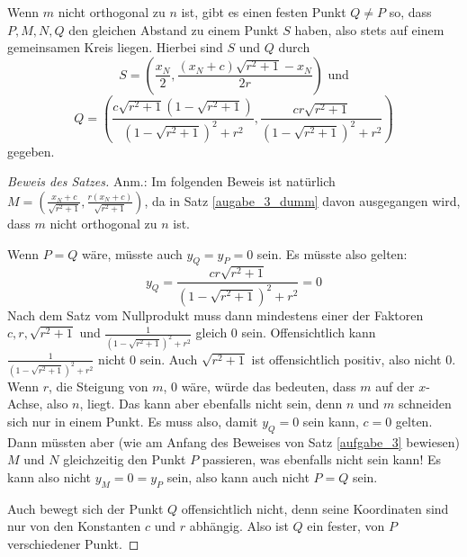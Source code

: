 \begin{thm}\label{augabe_3_dumm}
    Wenn $m$ nicht orthogonal zu $n$ ist, gibt es einen festen Punkt $Q\neq P$ so, dass $P, M, N, Q$ 
    den gleichen Abstand zu einem Punkt $S$ haben, also stets auf einem gemeinsamen Kreis liegen. 
    Hierbei sind $S$ und $Q$ durch
    \[
    S=\left(\frac{x_N}{2},\frac{(x_N+c)\sqrt{r^2+1}-x_N}{2r}\right)\text{ und}
    \]
    \[
    Q=\left(\frac{c\sqrt{r^2+1}\left(1-\sqrt{r^2+1}\right)}{\left(1-\sqrt{r^2+1}\right)^2+r^2}, 
    \frac{cr\sqrt{r^2+1}}{\left(1-\sqrt{r^2+1}\right)^2+r^2}\right)
    \]
    gegeben.
\end{thm}
\begin{proof}[Beweis des Satzes]
    \renewcommand{\qedsymbol}{$\square$}
    Anm.: Im folgenden Beweis ist natürlich $M=\left( \frac{x_N+c}{\sqrt{r^2+1}} , \frac{r(x_N+c)}{\sqrt{r^2+1}} 
    \right)$, da in Satz \ref{augabe_3_dumm} davon ausgegangen wird, dass $m$ nicht orthogonal zu $n$ ist.

    Wenn $P=Q$ wäre, müsste auch $y_Q=y_P=0$ sein. Es müsste also gelten:
    \[
        y_Q=\frac{cr\sqrt{r^2+1}}{(1-\sqrt{r^2+1})^2+r^2}=0
    \]
    Nach dem Satz vom Nullprodukt muss dann mindestens einer der Faktoren $c, r, \sqrt{r^2+1}$ und $\frac{1}{(1-
    \sqrt{r^2+1})^2+r^2}$ gleich 0 sein. Offensichtlich kann $\frac{1}{(1-\sqrt{r^2+1})^2+r^2}$ nicht 0 sein. Auch 
    $\sqrt{r^2+1}$ ist offensichtlich positiv, also nicht 0. Wenn $r$, die Steigung von $m$, 0 wäre, würde das 
    bedeuten, dass $m$ auf der $x$-Achse, also $n$, liegt. Das kann aber ebenfalls nicht sein, denn $n$ und $m$ 
    schneiden sich nur in einem Punkt. Es muss also, damit $y_Q=0$ sein kann, $c=0$ gelten. Dann müssten aber (wie 
    am Anfang des Beweises von Satz \ref{aufgabe_3} bewiesen) $M$ und $N$ gleichzeitig den Punkt $P$ passieren, was 
    ebenfalls nicht sein kann! Es kann also nicht $y_M=0=y_P$ sein, also kann auch nicht $P=Q$ sein.

    Auch bewegt sich der Punkt $Q$ offensichtlich nicht, denn seine Koordinaten sind nur von den Konstanten $c$ und 
    $r$ abhängig. Also ist $Q$ ein fester, von $P$ verschiedener Punkt.


\end{proof}
